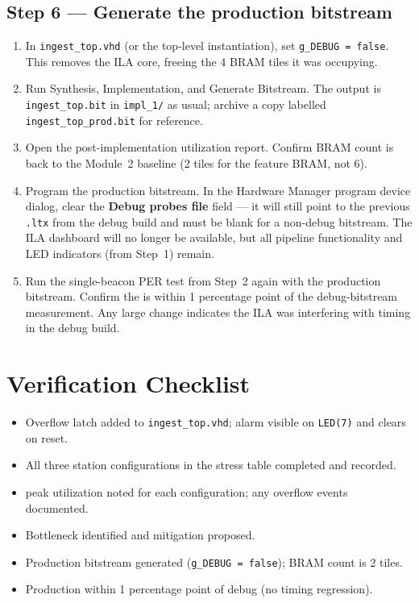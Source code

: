 \documentclass[11pt,letterpaper]{article}
\begin{document}
\newpage
\subsection{Step 6 --- Generate the production bitstream}
\begin{enumerate}[leftmargin=2em]
	\item In \texttt{ingest\_top.vhd} (or the top-level instantiation), set \texttt{g\_DEBUG = false}. This removes the \mbox{ILA} core, freeing the 4 \mbox{BRAM{}} tiles it was occupying.
	\item Run Synthesis, Implementation, and Generate Bitstream. The output is \texttt{ingest\_top.bit} in \texttt{impl\_1/} as usual; archive a copy labelled \texttt{ingest\_top\_prod.bit} for reference.
	\item Open the post-implementation utilization report. Confirm \mbox{BRAM{}} count is back to the Module~2 baseline (2 tiles for the feature \mbox{BRAM{}}, not 6).
	\item Program the production bitstream. In the Hardware Manager program device dialog, clear the \textbf{Debug probes file} field --- it will still point to the previous \texttt{.ltx} from the debug build and must be blank for a non-debug bitstream. The \mbox{ILA{}} dashboard will no longer be available, but all pipeline functionality and \mbox{LED{}} indicators (from Step~1) remain.
	\item Run the single-beacon PER test from Step~2 again with the production bitstream. Confirm the \PER{} is within 1 percentage point of the debug-bitstream measurement. Any large change indicates the \mbox{ILA{}} was interfering with timing in the debug build.
\end{enumerate}


\section{Verification Checklist}
\begin{itemize}[leftmargin=2em]
	\item[$\square$] Overflow latch added to \texttt{ingest\_top.vhd}; alarm visible on \texttt{LED(7)} and clears on reset.
	\item[$\square$] All three station configurations in the stress table completed and recorded.
	\item[$\square$] \FIFO{} peak utilization noted for each configuration; any overflow events documented.
	\item[$\square$] Bottleneck identified and mitigation proposed.
	\item[$\square$] Production bitstream generated (\texttt{g\_DEBUG = false}); \mbox{BRAM{}} count is 2 tiles.
	\item[$\square$] Production \PER{} within 1 percentage point of debug \PER{} (no timing regression).
\end{itemize}
\end{document}

